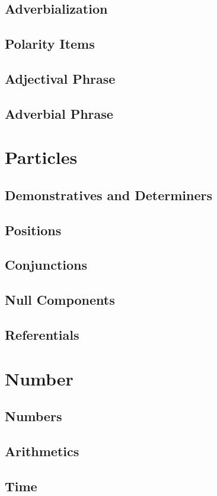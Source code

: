 \documentclass{article}
\begin{document}
	\section{Adverbialization}
	\section{Polarity Items}
	\section{Adjectival Phrase}
	\section{Adverbial Phrase}
	
\chapter{Particles}
	\section{Demonstratives and Determiners}
	\section{Positions}
	\section{Conjunctions}
	\section{Null Components}
	\section{Referentials}

\chapter{Number}
	\section{Numbers}
	\section{Arithmetics}
	\section{Time}
\end{document}
